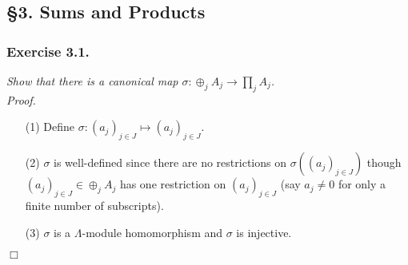 \documentclass{article}
\begin{document}



\subsection*{\S 3. Sums and Products \\}



\subsubsection*{Exercise 3.1.}
\emph{Show that there is a canonical map $\sigma: \oplus_{j} A_j \to \prod_j A_j$.} \\



\emph{Proof.}
\begin{enumerate}
\item[(1)]
  Define $\sigma: (a_j)_{j \in J} \mapsto (a_j)_{j \in J}$.

\item[(2)]
  $\sigma$ is well-defined since there are no restrictions on $\sigma((a_j)_{j \in J})$
  though $(a_j)_{j \in J} \in \oplus_{j} A_j$ has one restriction on $(a_j)_{j \in J}$
  (say $a_j \neq 0$ for only a finite number of subscripts).

\item[(3)]
  $\sigma$ is a $\Lambda$-module homomorphism and $\sigma$ is injective.
\end{enumerate}
$\Box$ \\\\



\end{document}
